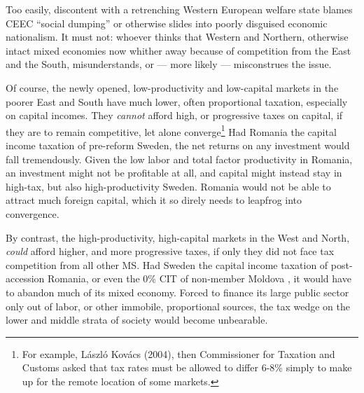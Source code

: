 \documentclass[11pt,a4paper,oneside,openright]{article}
\begin{document}




Too easily, discontent with a retrenching Western European welfare state blames \gls{CEEC} ``social dumping'' %
or otherwise slides into poorly disguised economic nationalism. It must not: whoever thinks that Western and Northern, otherwise intact mixed economies now whither away because of competition from the East and the South, misunderstands, or --- more likely --- misconstrues the issue.

Of course, the newly opened, low-productivity and low-capital markets in the poorer East and South have much lower, often proportional taxation, especially on capital incomes. They \emph{cannot} afford high, or progressive taxes on capital, if they are to remain competitive, let alone converge\footnote{
	For example, L\'{a}szl\'{o} Kov\'{a}cs (2004), then Commissioner for Taxation and Customs asked that tax rates must be allowed to differ 6-8\% simply to make up for the remote location of some markets.} 
Had Romania the capital income taxation of pre-reform Sweden, the net returns on any investment would fall tremendously. Given the low labor and total factor productivity in Romania, an investment might not be profitable at all, and capital might instead stay in high-tax, but also high-productivity Sweden. Romania would not be able to attract much foreign capital, which it so direly needs to leapfrog into convergence.
	
By contrast, the high-productivity, high-capital markets in the West and North, \emph{could} afford higher, and more progressive taxes, if only they did not face tax competition from all other \gls{MS}. Had Sweden the capital income taxation of post-accession Romania, or even the 0\% \gls{CIT} of non-member Moldova \citep{Piatkowski2008}, it would have to abandon much of its mixed economy. Forced to finance its large public sector only out of labor, or other immobile, proportional sources, the tax wedge on the lower and middle strata of society would become unbearable. %
\end{document}
